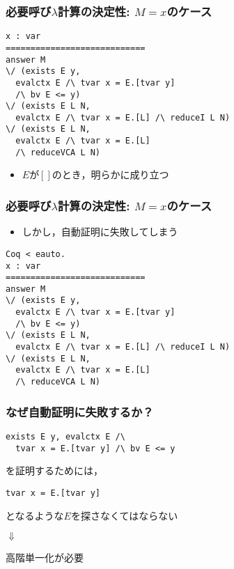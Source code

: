 \documentclass[dvipdfmx,cjk,xcolor=dvipsnames,envcountsect,notheorems,12pt]{beamer}
\theoremstyle{definition}
\begin{document}
\begin{frame}[fragile]
	\frametitle{必要呼び$\lambda$計算の決定性: $M=x$のケース}
\begin{lstlisting}
x : var
============================
answer M
\/ (exists E y,
  evalctx E /\ tvar x = E.[tvar y]
  /\ bv E <= y)
\/ (exists E L N,
  evalctx E /\ tvar x = E.[L] /\ reduceI L N)
\/ (exists E L N,
  evalctx E /\ tvar x = E.[L]
  /\ reduceVCA L N)
\end{lstlisting}
	\begin{itemize}
		\item $E$が$[]$のとき，明らかに成り立つ
	\end{itemize}
\end{frame}

\begin{frame}[fragile]
	\frametitle{必要呼び$\lambda$計算の決定性: $M=x$のケース}
	\begin{itemize}
		\item しかし，自動証明に失敗してしまう
	\end{itemize}
\begin{lstlisting}
Coq < eauto.
x : var
============================
answer M
\/ (exists E y,
  evalctx E /\ tvar x = E.[tvar y]
  /\ bv E <= y)
\/ (exists E L N,
  evalctx E /\ tvar x = E.[L] /\ reduceI L N)
\/ (exists E L N,
  evalctx E /\ tvar x = E.[L]
  /\ reduceVCA L N)
\end{lstlisting}
\end{frame}

\begin{frame}[fragile]
	\frametitle{なぜ自動証明に失敗するか？}
\Large
\begin{lstlisting}
exists E y, evalctx E /\
  tvar x = E.[tvar y] /\ bv E <= y
\end{lstlisting}
	を証明するためには，
\begin{lstlisting}
tvar x = E.[tvar y]
\end{lstlisting}
	となるような$E$を探さなくてはならない
	\vfill
	\begin{center}$\Downarrow$\end{center} %
\vfill
	\begin{center}
		高階単一化が必要
	\end{center}
\end{frame}
\end{document}
